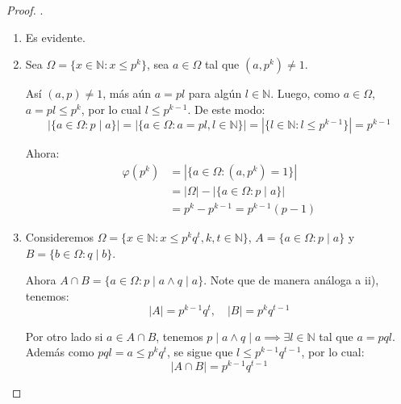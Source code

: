 \begin{proof}. \par

	\begin{enumerate}[label=\roman *), font=\normalfont]
		\item Es evidente.
		\item Sea $\Omega = \{x \in \mathbb{N} : x \le p^k\}$, sea $a \in \Omega$ tal que $(a, p^k) \neq 1$.

		      Así $(a, p) \neq 1$, más aún $a = pl$ para algún $l \in \mathbb{N}$. Luego, como $a \in \Omega$, $a = pl \le p^k$, por lo cual $l \le p^{k-1}$. De este modo:
		      \begin{equation*}
			      |\{a \in \Omega : p \mid a\}| = |\{a \in \Omega : a=pl, l \in \mathbb{N}\}| = |\{l \in \mathbb{N} : l \le p^{k-1}\}| = p^{k-1}
		      \end{equation*}

		      Ahora:
		      \begin{align*}
			      \varphi(p^k) & = |\{a \in \Omega : (a, p^k) = 1\}|        \\
			                   & = |\Omega| - |\{a \in \Omega : p \mid a\}| \\
			                   & = p^k - p^{k-1} = p^{k-1}(p-1)
		      \end{align*}
		\item Consideremos $\Omega = \{x \in \mathbb{N} : x \le p^k q^t, k,t \in \mathbb{N}\}$, $A = \{a \in \Omega : p \mid a\}$ y $B = \{b \in \Omega : q \mid b\}$.

		      Ahora $A \cap B = \{a \in \Omega : p \mid a \land q \mid a\}$. Note que de manera análoga a ii), tenemos:
		      \begin{equation*}
			      |A| = p^{k-1}q^t, \quad |B| = p^k q^{t-1}
		      \end{equation*}

		      Por otro lado si $a \in A \cap B$, tenemos $p \mid a \land q \mid a \implies \exists l \in \mathbb{N}$ tal que $a = pql$.
		      Además como $pql = a \le p^k q^t$, se sigue que $l \le p^{k-1}q^{t-1}$, por lo cual:
		      \begin{equation*}
			      |A \cap B| = p^{k-1}q^{t-1}
		      \end{equation*}


\end{enumerate}
\end{proof}

